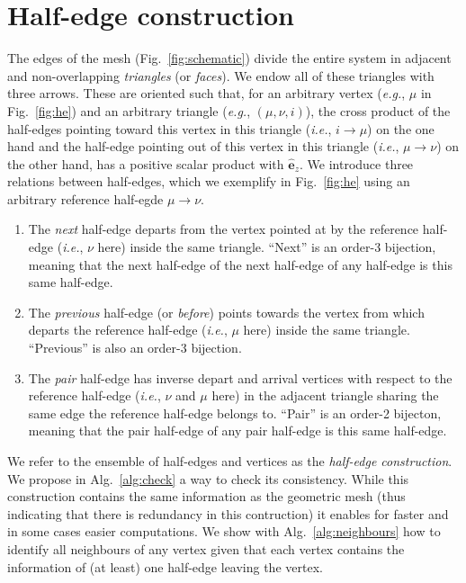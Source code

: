 \documentclass[aps, superscriptaddress, notitlepage]{revtex4-1}
\begin{document}
\section{Half-edge construction}

The edges of the mesh (Fig.~\ref{fig:schematic}) divide the entire system in adjacent and non-overlapping \textit{triangles} (or \textit{faces}). We endow all of these triangles with three arrows. These are oriented such that, for an arbitrary vertex (\textit{e.g.}, $\mu$ in Fig.~\ref{fig:he}) and an arbitrary triangle (\textit{e.g.}, $(\mu, \nu, i)$), the cross product of the half-edges pointing toward this vertex in this triangle (\textit{i.e.}, $i \to \mu$) on the one hand and the half-edge pointing out of this vertex in this triangle (\textit{i.e.}, $\mu \to \nu$) on the other hand, has a positive scalar product with $\hat{\boldsymbol{e}}_z$. We introduce three relations between half-edges, which we exemplify in Fig.~\ref{fig:he} using an arbitrary {\color{yellow} reference half-egde $\mu \to \nu$}.
\begin{enumerate}
    \item The {\color{purple} \textit{next} half-edge} departs from the vertex pointed at by the reference half-edge (\textit{i.e.}, $\nu$ here) inside the same triangle. ``Next'' is an order-3 bijection, meaning that the next half-edge of the next half-edge of any half-edge is this same half-edge.
    \item The {\color{green} \textit{previous} half-edge} (or {\color{green}\textit{before}}) points towards the vertex from which departs the reference half-edge (\textit{i.e.}, $\mu$ here) inside the same triangle. ``Previous'' is also an order-3 bijection.
    \item The {\color{blue} \textit{pair} half-edge} has inverse depart and arrival vertices with respect to the reference half-edge (\textit{i.e.}, $\nu$ and $\mu$ here) in the adjacent triangle sharing the same edge the reference half-edge belongs to. ``Pair'' is an order-2 bijecton, meaning that the pair half-edge of any pair half-edge is this same half-edge.
\end{enumerate}
We refer to the ensemble of half-edges and vertices as the \textit{half-edge construction}. We propose in Alg.~\ref{alg:check} a way to check its consistency. While this construction contains the same information as the geometric mesh (thus indicating that there is redundancy in this contruction) it enables for faster and in some cases easier computations. We show with Alg.~\ref{alg:neighbours} how to identify all neighbours of any vertex given that each vertex contains the information of (at least) one half-edge leaving the vertex.
\end{document}
